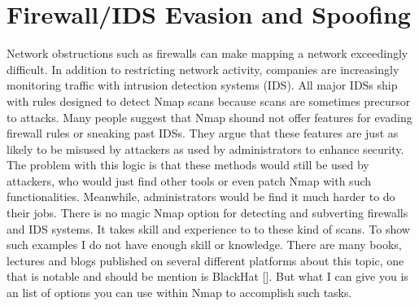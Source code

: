 \documentclass[times, utf8, seminar,english]{fer}
\begin{document}
\section{Firewall/IDS Evasion and Spoofing}
Network obstructions such as firewalls can make mapping a network exceedingly difficult. In addition to restricting network activity, companies are increasingly monitoring traffic with intrusion detection systems (IDS). All major IDSs ship with rules designed to detect Nmap scans because scans are sometimes precursor to attacks. Many people suggest that Nmap shound not offer features for evading firewall rules or sneaking past IDSs. They argue that these features are just as likely to be misused by attackers as used by administrators to enhance security. The problem with this logic is that these methods would still be used by attackers, who would just find other tools or even patch Nmap with such functionalities. Meanwhile, administrators would be find it much harder to do their jobs. There is no magic Nmap option for detecting and subverting firewalls and IDS systems. It takes skill and experience to to these kind of scans. To show such examples I do not have enough skill or knowledge. There are many books, lectures and blogs published on several different platforms about this topic, one that is notable and should be mention is BlackHat [\cite{bhat}]. But what I can give you is an list of options you can use within Nmap to accomplish such tasks.
\end{document}
